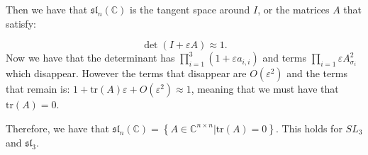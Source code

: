 \documentclass[]{article}
\newcommand{\tr}{\text{tr}}
\begin{document}
Then we have that $\mathfrak{sl}_n(\mathbb{C})$ is the tangent space around $I$, or the matrices $A$ that satisfy:

\begin{equation}
	\det \left(I + \varepsilon A\right) \approx 1.
\end{equation}
Now we have that the determinant has $\prod_{i = 1}^3 ( 1 + \varepsilon a_{i,i})$ and terms $\prod_{i = 1} \varepsilon A_{\sigma_i}^2$ which disappear. However the terms that disappear are $O(\varepsilon^2)$ and the terms that remain is: $1 + \tr(A) \varepsilon + O(\varepsilon^2) \approx 1$, meaning that we must have that $\tr(A) = 0$. 

Therefore, we have that $\mathfrak{sl}_n(\mathbb{C}) = \left\{A \in \mathbb{C}^{n \times n} | \tr(A) = 0\right\}$.
This holds for $SL_3$ and $\mathfrak{sl}_3$. 
\end{document}
